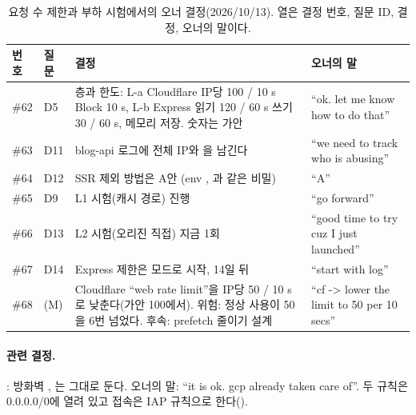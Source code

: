 \begin{table}[H]
  \caption{요청 수 제한과 부하 시험에서의 오너 결정(2026/10/13). 열은 결정 번호, 질문 ID, 결정, 오너의 말이다.}
  \label{tab:bl-decisions}
  \centering\footnotesize
  \begin{tabularx}{\linewidth}{@{}L{1.0cm}L{1.2cm}Y L{4.0cm}@{}}
    \toprule
    번호 & 질문 & 결정 & 오너의 말 \\
    \midrule
    \#62 & D5 & 층과 한도: L-a Cloudflare  IP당 100 / 10 s Block 10 s, L-b Express 읽기 120 / 60 s 쓰기 30 / 60 s, 메모리 저장. 숫자는 가안 & ``ok. let me know how to do that'' \\
    \midrule
    \#63 & D11 & blog-api 로그에 전체 IP와 을 남긴다 & ``we need to track who is abusing'' \\
    \midrule
    \#64 & D12 & SSR 제외 방법은 A안  (env , 과 같은 비밀) & ``A'' \\
    \midrule
    \#65 & D9 & L1 시험(캐시  경로) 진행 & ``go forward'' \\
    \midrule
    \#66 & D13 & L2 시험(오리진 직접) 지금 1회 & ``good time to try cuz I just launched'' \\
    \midrule
    \#67 & D14 & Express 제한은  모드로 시작, 14일 뒤  & ``start with log'' \\
    \midrule
    \#68 & (M) & Cloudflare ``web rate limit''을 IP당 50 / 10 s로 낮춘다(가안 100에서). 위험: 정상 사용이 50을 6번 넘었다. 후속: prefetch 줄이기 설계 & ``cf -> lower the limit to 50 per 10 secs'' \\
    \bottomrule
  \end{tabularx}
\end{table}

\paragraph{관련 결정.}
: 방화벽 , 는 그대로 둔다.
오너의 말: ``it is ok. gcp already taken care of''.
두 규칙은 0.0.0.0/0에 열려 있고 접속은 IAP 규칙으로 한다().
